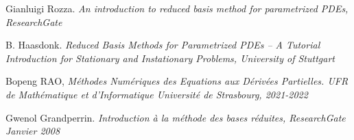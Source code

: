 \documentclass[12pt]{article}
\begin{document}
\begin{thebibliography}{9}

Gianluigi Rozza.  \emph{An introduction to reduced basis method for parametrized PDEs, ResearchGate}

B. Haasdonk.  \emph{Reduced Basis Methods for Parametrized PDEs –
A Tutorial Introduction for Stationary and
Instationary Problems, University of Stuttgart  } 



Bopeng RAO,  \emph{ Méthodes Numériques
des Equations aux Dérivées Partielles. UFR de Mathématique et d’Informatique
Université de Strasbourg, 2021-2022 }

Gwenol Grandperrin.  \emph{Introduction à la méthode des bases réduites, ResearchGate Janvier 2008 }

\end{thebibliography}
\end{document}
